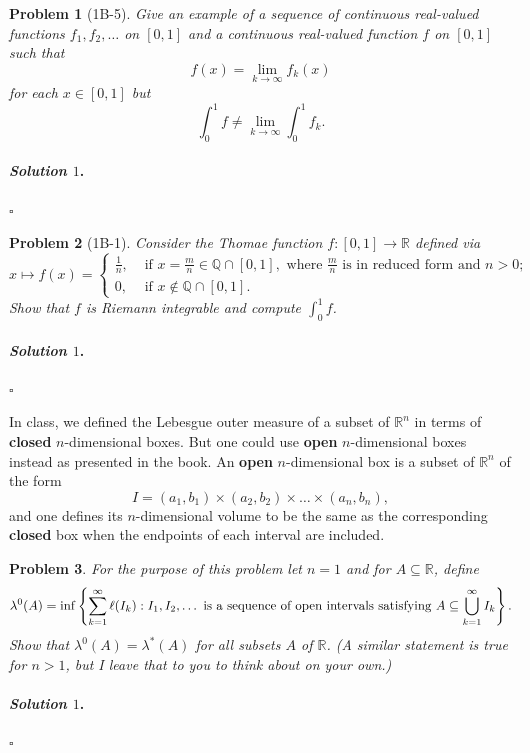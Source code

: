 \documentclass[reqno]{amsart}
\theoremstyle{plain}
\newtheorem{problem}{Problem}
\theoremstyle{definition}
\newenvironment{solution1}{\paragraph{\emph{Solution $1$}.}}{\hfill$\square$}
\begin{document}
\begin{problem}[1B-5]
Give an example of a sequence of continuous real-valued functions $f_{1},f_{2},\ldots$ on $[0,1]$ and a continuous real-valued function $f$ on $[0,1]$ such that
$$f(x) = \lim_{k \to \infty} f_{k}(x) $$
for each $x \in [0,1]$ but
$$\int_{0}^{1}f \neq \lim_{k \to \infty} \int_{0}^{1} f_{k}. $$
\end{problem}
\begin{solution1}

\end{solution1}

\begin{problem}[1B-1]
Consider the Thomae function $f:[0,1] \rightarrow \mathbb{R}$ defined via
$$x \mapsto f(x) = \begin{cases}\frac{1}{n}, &\text{ if } x = \frac{m}{n} \in \mathbb{Q}\cap [0,1], \text{ where } \frac{m}{n} \text{ is in reduced form and } n > 0;\\ 0, &\text{ if } x \notin \mathbb{Q}\cap[0,1].  \end{cases} $$
Show that $f$ is Riemann integrable and compute $\int_{0}^{1} f$.
\end{problem}
\begin{solution1}

\end{solution1}



In class, we defined the Lebesgue outer measure of a subset of $\mathbb{R}^{n}$ in terms of {\bfseries closed} $n$-dimensional boxes.  But one could use {\bfseries open} $n$-dimensional boxes instead as presented in the book.  An {\bfseries open} $n$-dimensional box is a subset of $\mathbb{R}^{n}$ of the form
$$I = (a_{1},b_{1}) \times (a_{2},b_{2}) \times \ldots \times (a_{n},b_{n}), $$
and one defines its $n$-dimensional volume to be the same as the corresponding {\bfseries closed} box when the endpoints of each interval are included.

\begin{problem}
For the purpose of this problem let $n=1$ and for $A \subseteq \mathbb{R}$, define
$$\lambda^{0}(A) = {\rm inf}\left\{\sum_{k=1}^{\infty}\ell(I_{k}) : I_{1},I_{2},\ldots \text{ is a sequence of open intervals satisfying } A \subseteq \bigcup_{k=1}^{\infty} I_{k}  \right\}. $$
Show that $\lambda^{0}(A) = \lambda^{*}(A)$ for all subsets $A$ of $\mathbb{R}$.  (A similar statement is true for $n > 1$, but I leave that to you to think about on your own.)
\end{problem}
\begin{solution1}

\end{solution1}
\end{document}
